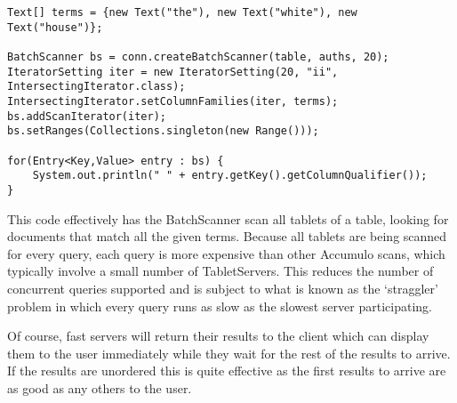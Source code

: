 \begingroup\fontsize{8pt}{8pt}\selectfont\begin{verbatim}
Text[] terms = {new Text("the"), new Text("white"), new Text("house")};

BatchScanner bs = conn.createBatchScanner(table, auths, 20);
IteratorSetting iter = new IteratorSetting(20, "ii", IntersectingIterator.class);
IntersectingIterator.setColumnFamilies(iter, terms);
bs.addScanIterator(iter);
bs.setRanges(Collections.singleton(new Range()));

for(Entry<Key,Value> entry : bs) {
    System.out.println(" " + entry.getKey().getColumnQualifier());
}
\end{verbatim}\endgroup

This code effectively has the BatchScanner scan all tablets of a table, looking for
documents that match all the given terms. Because all tablets are being scanned for
every query, each query is more expensive than other Accumulo scans, which
typically involve a small number of TabletServers. This reduces the number of
concurrent queries supported and is subject to what is known as the `straggler'
problem in which every query runs as slow as the slowest server participating.

Of course, fast servers will return their results to the client which can display them
to the user immediately while they wait for the rest of the results to arrive. If the
results are unordered this is quite effective as the first results to arrive are as good
as any others to the user.


